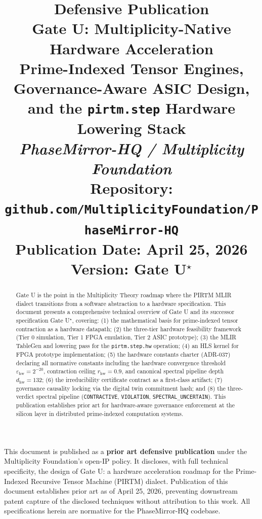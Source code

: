 \documentclass[12pt,letterpaper]{article}
\title{
  \vspace{-1cm}
  {\Large \textbf{Defensive Publication}} \\[0.4em]
  {\huge \textbf{Gate U: Multiplicity-Native Hardware Acceleration}} \\[0.4em]
  {\Large Prime-Indexed Tensor Engines, Governance-Aware ASIC Design,\\
   and the \texttt{pirtm.step} Hardware Lowering Stack} \\[0.6em]
  {\normalsize \textit{PhaseMirror-HQ / Multiplicity Foundation}} \\[0.3em]
  {\normalsize Repository: \texttt{github.com/MultiplicityFoundation/PhaseMirror-HQ}} \\[0.3em]
  {\normalsize Publication Date: April 25, 2026 \quad Version: Gate U\ensuremath{^{\star}}}
}
\author{}
\date{}
\theoremstyle{plain}
\theoremstyle{definition}
\theoremstyle{remark}
\begin{document}
\maketitle
\thispagestyle{fancy}

\begin{defensebox}
This document is published as a \textbf{prior art defensive publication} under the
Multiplicity Foundation's open-IP policy. It discloses, with full technical
specificity, the design of Gate U: a hardware acceleration roadmap for the
Prime-Indexed Recursive Tensor Machine (PIRTM) dialect. Publication of this
document establishes prior art as of April 25, 2026, preventing downstream
patent capture of the disclosed techniques without attribution to this work.
All specifications herein are normative for the PhaseMirror-HQ codebase.
\end{defensebox}

\vspace{0.5em}

\begin{abstract}
\noindent
Gate U is the point in the Multiplicity Theory roadmap where the PIRTM MLIR
dialect transitions from a software abstraction to a hardware specification.
This document presents a comprehensive technical overview of Gate U and its
successor specification Gate U\ensuremath{^{\star}}, covering: (1) the mathematical basis
for prime-indexed tensor contraction as a hardware datapath; (2) the three-tier
hardware feasibility framework (Tier 0 simulation, Tier 1 FPGA emulation,
Tier 2 ASIC prototype); (3) the MLIR TableGen and lowering pass for the
\texttt{pirtm.step.hw} operation; (4) an HLS kernel for FPGA prototype
implementation; (5) the hardware constants charter (ADR-037) declaring all
normative constants including the hardware convergence threshold
\(\varepsilon_{\mathrm{hw}} = 2^{-20}\), contraction ceiling
\(r_{\mathrm{hw}} = 0.9\), and canonical spectral pipeline depth
\(d_{\mathrm{hw}} = 132\); (6) the irreducibility certificate contract as a
first-class artifact; (7) governance causality locking via the digital twin
commitment hash; and (8) the three-verdict spectral pipeline
(\texttt{CONTRACTIVE}, \texttt{VIOLATION}, \texttt{SPECTRAL\_UNCERTAIN}).
This publication establishes prior art for hardware-aware governance enforcement
at the silicon layer in distributed prime-indexed computation systems.
\end{abstract}

\tableofcontents
\newpage
\end{document}
